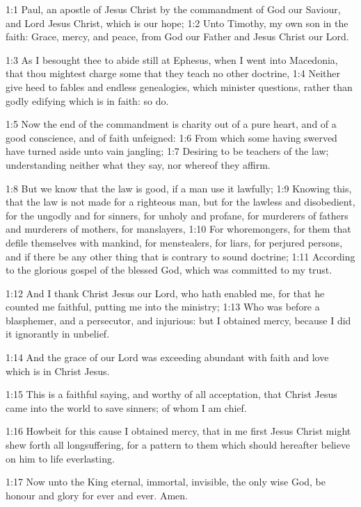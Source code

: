 

1:1 Paul, an apostle of Jesus Christ by the commandment of God our Saviour, and Lord Jesus Christ, which is our hope; 1:2 Unto Timothy, my own son in the faith: Grace, mercy, and peace, from God our Father and Jesus Christ our Lord.

1:3 As I besought thee to abide still at Ephesus, when I went into Macedonia, that thou mightest charge some that they teach no other doctrine, 1:4 Neither give heed to fables and endless genealogies, which minister questions, rather than godly edifying which is in faith: so do.

1:5 Now the end of the commandment is charity out of a pure heart, and of a good conscience, and of faith unfeigned: 1:6 From which some having swerved have turned aside unto vain jangling; 1:7 Desiring to be teachers of the law; understanding neither what they say, nor whereof they affirm.

1:8 But we know that the law is good, if a man use it lawfully; 1:9 Knowing this, that the law is not made for a righteous man, but for the lawless and disobedient, for the ungodly and for sinners, for unholy and profane, for murderers of fathers and murderers of mothers, for manslayers, 1:10 For whoremongers, for them that defile themselves with mankind, for menstealers, for liars, for perjured persons, and if there be any other thing that is contrary to sound doctrine; 1:11 According to the glorious gospel of the blessed God, which was committed to my trust.

1:12 And I thank Christ Jesus our Lord, who hath enabled me, for that he counted me faithful, putting me into the ministry; 1:13 Who was before a blasphemer, and a persecutor, and injurious: but I obtained mercy, because I did it ignorantly in unbelief.

1:14 And the grace of our Lord was exceeding abundant with faith and love which is in Christ Jesus.

1:15 This is a faithful saying, and worthy of all acceptation, that Christ Jesus came into the world to save sinners; of whom I am chief.

1:16 Howbeit for this cause I obtained mercy, that in me first Jesus Christ might shew forth all longsuffering, for a pattern to them which should hereafter believe on him to life everlasting.

1:17 Now unto the King eternal, immortal, invisible, the only wise God, be honour and glory for ever and ever. Amen.

